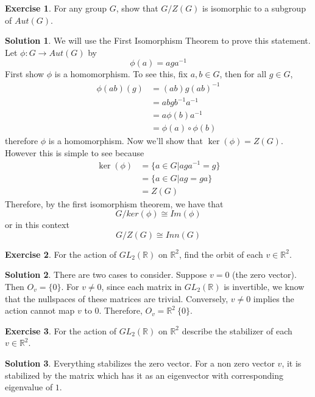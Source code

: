 \documentclass[12pt]{article}
\theoremstyle{definition}
\newcommand{\R}{\mathbb{R}}
\newtheorem{exercise}{\color{YellowOrange}Exercise}
\theoremstyle{definition}
\newtheorem{solution}{\color{Goldenrod}Solution}
\begin{document}
\begin{exercise}
	For any group $G$, show that $G/Z(G)$ is isomorphic to a subgroup of $Aut(G)$. 
\end{exercise}
\begin{solution}
	We will use the First Isomorphism Theorem to prove this statement. Let $\phi : G \to Aut(G)$ by
	\begin{equation}
		\phi(a) = aga^{-1}
	\end{equation}
	First show $\phi$ is a homomorphism. To see this, fix $a,b \in G$, then for all $g \in G$,
	\begin{align*}
	\phi(ab)(g) &= (ab)g(ab)^{-1} \\
	&= ab g b^{-1}a^{-1} \\
	&= a \phi(b) a^{-1} \\
	&= \phi(a) \circ \phi(b)
	\end{align*}
	therefore $\phi$ is a homomorphism. Now we'll show that $\ker(\phi) = Z(G)$. However this is simple to see because
	\begin{align*}
	\ker(\phi) &= \{a \in G | aga^{-1} = g\} \\
	&= \{a \in G | ag = ga \}\\
	&= Z(G)
	\end{align*}
	Therefore, by the first isomorphism theorem, we have that
	\begin{equation}
		G/ker(\phi) \cong Im(\phi)
	\end{equation}
	or in this context
	\begin{equation}
		G/Z(G) \cong Inn(G)
	\end{equation}
\end{solution}

\begin{exercise}
For the action of $GL_2(\mathbb{R})$ on $\R^2$, find the orbit of each $v \in \R^2$. 
\end{exercise}
\begin{solution}
There are two cases to consider. Suppose $v = 0$ (the zero vector). Then $O_v = \{0\}$. For $v \neq 0$, since each matrix in $GL_2(\mathbb{R})$ is invertible, we know that the nullspaces of these matrices are trivial. Conversely, $v\neq 0$ implies the action cannot map $v$ to 0. Therefore, $O_v = \R^2 \ \{0 \}$. 
\end{solution}

\begin{exercise}
	For the action of $GL_2(\R)$ on $\R^2$ describe the stabilizer of each $v \in \R^2$.  
\end{exercise}
\begin{solution}
	Everything stabilizes the zero vector. For a non zero vector $v$, it is stabilized by the matrix which has it as an eigenvector with corresponding eigenvalue of $1$. 
\end{solution}
\end{document}
